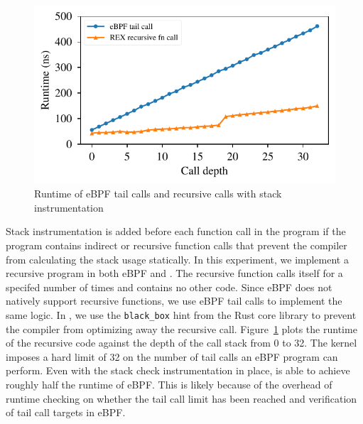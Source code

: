 \begin{figure}[t]
    \includegraphics[width=1.0\linewidth]{figs/recursive.pdf}
    \centering
    \vspace{-25pt}
    \caption{Runtime of eBPF tail calls and \projname{} recursive calls with
    stack instrumentation}
    \label{fig:eval-recursion}
    \vspace{-10pt}
\end{figure}
Stack instrumentation is added before each
    function call in the \projname{} program if the program contains indirect
    or recursive function calls that prevent the compiler from calculating the
    stack usage statically.
In this experiment, we implement a recursive program in both
    eBPF and \projname{}.
The recursive function calls itself for a specifed number of times and contains
    no other code.
Since eBPF does not natively support recursive functions, we use eBPF tail
    calls to implement the same logic.
In \projname{}, we use the \texttt{black\_box} hint from the Rust core library
    to prevent the compiler from optimizing away the recursive call.
Figure~\ref{fig:eval-recursion} plots the runtime of the recursive code against
    the depth of the call stack from 0 to 32.
The kernel imposes a hard limit of 32 on the number of tail calls an eBPF
    program can perform.
Even with the stack check instrumentation in place, \projname{} is able to
    achieve roughly half the runtime of eBPF.
This is likely because of the overhead of runtime checking on whether the tail
    call limit has been reached and verification of tail call targets in eBPF.
